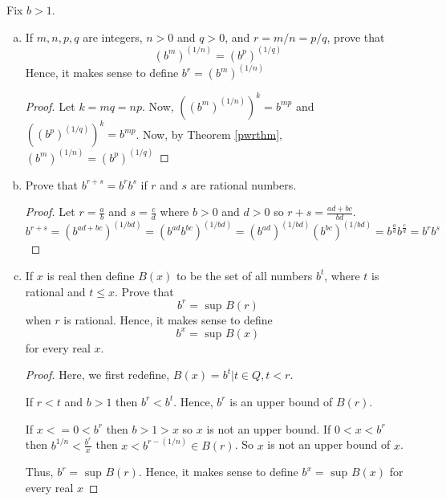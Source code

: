 \begin{prblm}
    Fix $b > 1$.
    \begin{enumerate}[(a)]
        \item If $m, n, p, q$ are integers, $n > 0$ and $q > 0$, and $r = m / n = p / q$, prove that
        $$ (b^m)^{(1/n)} = (b^p)^{(1/q)} $$
        Hence, it makes sense to define $b^r = (b^m)^{(1/n)}$
   
        \begin{proof}
            Let $k = mq = np$. Now, $((b^m)^{(1/n)})^{k} = b^{mp}$
            and $((b^p)^{(1/q)})^{k} = b^{mp}$. 
            Now, by Theorem \ref{pwrthm}, $(b^m)^{(1/n)} = (b^p)^{(1/q)}$
        \end{proof}


       \item Prove that $b^{r+s} = b^r b^s$ if $r$ and $s$ are rational numbers.
       
       \begin{proof}
            Let $r = \frac{a}{b}$ and $s = \frac{c}{d}$ where $b > 0$ and $d > 0$ so $r + s = \frac{ad + bc}{bd}$.
            $$ b^{r+s} = (b^{ad + bc})^{(1 / bd)} 
                        = (b^{ad} b^{bc})^{(1/bd)}
                        = (b^{ad})^{(1/bd)} (b^{bc})^{(1/bd)}
                        = b^{\frac{a}{d}} b^{\frac{c}{d}}
                        = b^r b^s $$
       \end{proof}

       \item If $x$ is real then define $B(x)$ to be the set of all numbers $b^t$, where $t$ is rational and $t \leq x$.
       Prove that $$ b^r = \text{ sup } B(r) $$ when $r$ is rational.
       Hence, it makes sense to define $$ b^x = \text{ sup } B(x) $$ for every real $x$.

       \begin{proof}
            Here, we first redefine, $B(x) = { b^t | t \in Q, t < r }$.

            If $r < t$ and $b > 1$ then $b^r < b^t$. Hence, $b^r$ is an upper bound of $B(r)$.

            If $x <= 0 < b^r$ then $b > 1 > x$ so $x$ is not an upper bound.
            If $0 < x < b^r$ then $b^{1/n} < \frac{b^r}{x}$ then $x < b^{r - (1/n)} \in B(r)$. So $x$ is not an upper bound of $x$.

            Thus, $b^r = \text{ sup } B(r)$. Hence, it makes sense to define $b^x = \text{ sup } B(x)$ for every real $x$
       \end{proof}


\end{enumerate}
\end{prblm}
